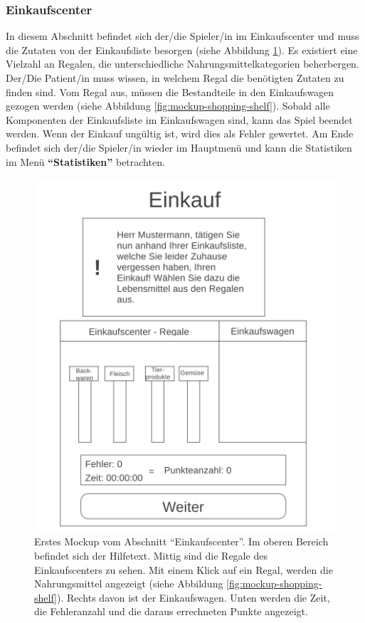 \subsubsection{Einkaufscenter}
In diesem Abschnitt befindet sich der/die Spieler/in im Einkaufscenter und muss die Zutaten von der Einkaufsliste besorgen (siehe Abbildung \ref{fig:mockup-shopping-center}). Es existiert eine Vielzahl an Regalen, die unterschiedliche Nahrungsmittelkategorien beherbergen. Der/Die Patient/in muss wissen, in welchem Regal die benötigten Zutaten zu finden sind. Vom Regal aus, müssen die Bestandteile in den Einkaufswagen gezogen werden (siehe Abbildung \ref{fig:mockup-shopping-shelf}). Sobald alle Komponenten der Einkaufsliste im Einkaufswagen sind, kann das Spiel beendet werden. Wenn der Einkauf ungültig ist, wird dies als Fehler gewertet. Am Ende befindet sich der/die Spieler/in wieder im Hauptmenü und kann die Statistiken im Menü \textbf{\enquote{Statistiken}} betrachten.

\begin{figure}[H]
    \centering
	\includegraphics[width=0.6\linewidth]{figures/development/mockup/shopping-center.png}
	\caption{Erstes Mockup vom Abschnitt \enquote{Einkaufscenter}. Im oberen Bereich befindet sich der Hilfetext. Mittig sind die Regale des Einkaufscenters zu sehen. Mit einem Klick auf ein Regal, werden die Nahrungsmittel angezeigt (siehe Abbildung \ref{fig:mockup-shopping-shelf}). Rechts davon ist der Einkaufswagen. Unten werden die Zeit, die Fehleranzahl und die daraus errechneten Punkte angezeigt.}
	\label{fig:mockup-shopping-center}
\end{figure}

